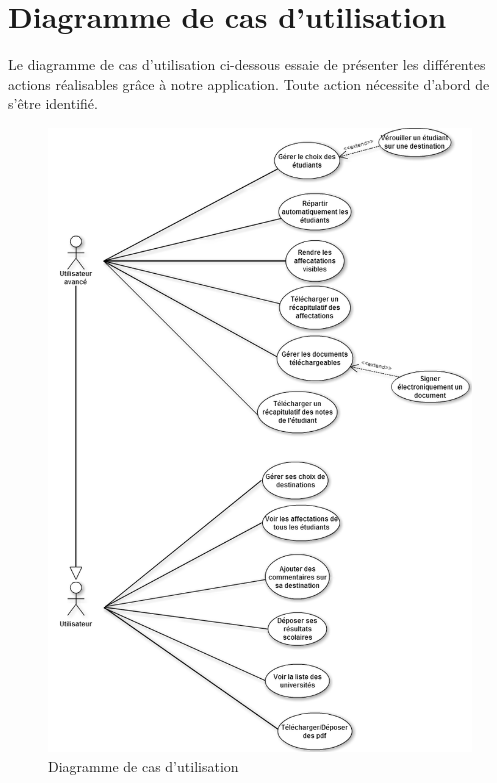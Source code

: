 \newpage
\section{Diagramme de cas d'utilisation}

Le diagramme de cas d'utilisation ci-dessous essaie de présenter les différentes actions réalisables grâce à notre application. Toute action nécessite d'abord de s'être identifié.

\begin{figure}[h!]
  \centering
  \includegraphics[scale=0.4]{Projet/useCaseDiag/useCaseDiagram.png}
  \caption{Diagramme de cas d'utilisation}
  \label{useCase}
\end{figure}

